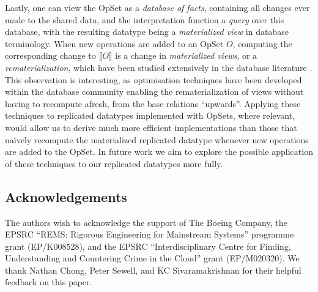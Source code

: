 \documentclass[a4paper,english]{lipics-v2018}
\newif\ifarxiv
\begin{document}
Lastly, one can view the OpSet as a \emph{database of facts}, containing all changes ever made to the shared data, and the interpretation function a \emph{query} over this database, with the resulting datatype being a \emph{materialized view} in database terminology.
When new operations are added to an OpSet $O$, computing the corresponding change to $\llbracket O \rrbracket$ is a change in \emph{materialized views}, or a \emph{rematerialization}, which have been studied extensively in the database literature \cite{Gupta:1999uz}.
This observation is interesting, as optimisation techniques have been developed within the database community enabling the rematerialization of views without having to recompute afresh, from the base relations ``upwards''.
Applying these techniques to replicated datatypes implemented with OpSets, where relevant, would allow us to derive much more efficient implementations than those that na\"ively recompute the materialized replicated datatype whenever new operations are added to the OpSet.
In future work we aim to explore the possible application of these techniques to our replicated datatypes more fully.

\subsection*{Acknowledgements}

The authors wish to acknowledge the support of The Boeing Company,
the EPSRC ``REMS: Rigorous Engineering for Mainstream Systems'' programme grant (EP/K008528), and
the EPSRC ``Interdisciplinary Centre for Finding, Understanding and Countering Crime in the Cloud'' grant (EP/M020320).
We thank Nathan Chong, Peter Sewell, and KC Sivaramakrishnan for their helpful feedback on this paper.


{}

\ifarxiv
\newpage
\appendix

\fi
\end{document}
